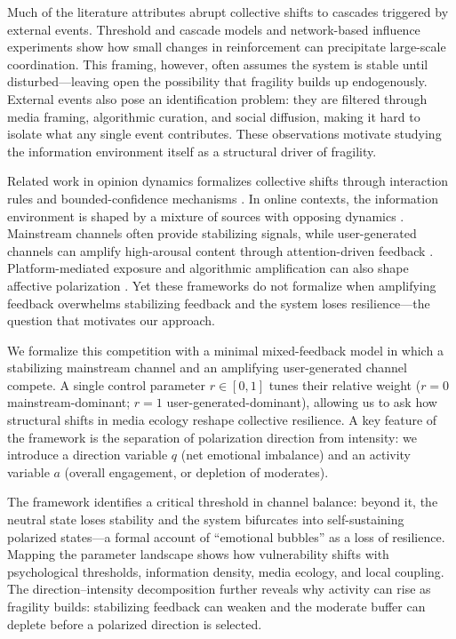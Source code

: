 \documentclass[11pt]{article}
\begin{document}
Much of the literature attributes abrupt collective shifts to cascades triggered by external events. Threshold and cascade models \citep{Granovetter1978,Watts2002,CentolaMacy2007,WattsDodds2007,Nyborg2016} and network-based influence experiments \citep{Centola2010,Becker2017} show how small changes in reinforcement can precipitate large-scale coordination. This framing, however, often assumes the system is stable until disturbed---leaving open the possibility that fragility builds up endogenously. External events also pose an identification problem: they are filtered through media framing, algorithmic curation, and social diffusion, making it hard to isolate what any single event contributes.
These observations motivate studying the information environment itself as a structural driver of fragility.

Related work in opinion dynamics formalizes collective shifts through interaction rules and bounded-confidence mechanisms \citep{Castellano2009,Deffuant2000,HegselmannKrause2002,HolleyLiggett1975,SoodRedner2005,Baronchelli2018,SchweitzerGarcia2010}. In online contexts, the information environment is shaped by a mixture of sources with opposing dynamics \citep{Chadwick2017}. Mainstream channels often provide stabilizing signals, while user-generated channels can amplify high-arousal content through attention-driven feedback \citep{Bakshy2015,DelVicario2016SciRep,Vosoughi2018,Piao2023}. Platform-mediated exposure and algorithmic amplification can also shape affective polarization \citep{Bail2018,Tornberg2022,Cinelli2021,Ribeiro2020,PennycookRand2021}. Yet these frameworks do not formalize when amplifying feedback overwhelms stabilizing feedback and the system loses resilience---the question that motivates our approach.

We formalize this competition with a minimal mixed-feedback model in which a stabilizing mainstream channel and an amplifying user-generated channel compete. A single control parameter $r\in[0,1]$ tunes their relative weight ($r=0$ mainstream-dominant; $r=1$ user-generated-dominant), allowing us to ask how structural shifts in media ecology reshape collective resilience. A key feature of the framework is the separation of polarization direction from intensity: we introduce a direction variable $q$ (net emotional imbalance) and an activity variable $a$ (overall engagement, or depletion of moderates).

The framework identifies a critical threshold in channel balance: beyond it, the neutral state loses stability and the system bifurcates into self-sustaining polarized states---a formal account of ``emotional bubbles'' as a loss of resilience. Mapping the parameter landscape shows how vulnerability shifts with psychological thresholds, information density, media ecology, and local coupling. The direction--intensity decomposition further reveals why activity can rise as fragility builds: stabilizing feedback can weaken and the moderate buffer can deplete before a polarized direction is selected.
\end{document}
